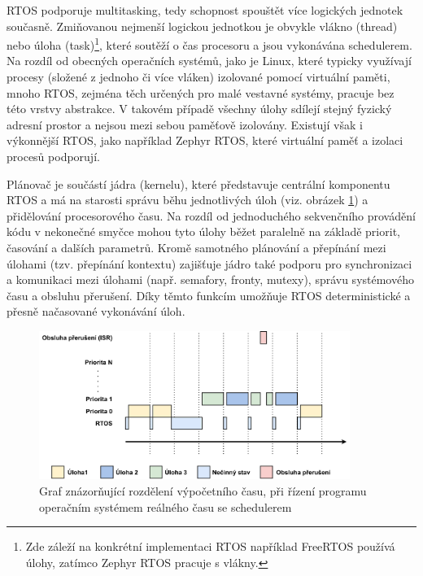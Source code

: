 RTOS podporuje multitasking, tedy schopnost spouštět více logických jednotek současně. Zmiňovanou nejmenší logickou jednotkou je obvykle vlákno (thread) nebo úloha (task)\footnote{Zde záleží na konkrétní implementaci RTOS například FreeRTOS používá úlohy, zatímco Zephyr RTOS pracuje s vlákny.}, které soutěží o čas procesoru a jsou vykonávána schedulerem. Na rozdíl od obecných operačních systémů, jako je Linux, které typicky využívají procesy (složené z jednoho či více vláken) izolované pomocí virtuální paměti, mnoho RTOS, zejména těch určených pro malé vestavné systémy, pracuje bez této vrstvy abstrakce. V takovém případě všechny úlohy sdílejí stejný fyzický adresní prostor a nejsou mezi sebou paměťově izolovány. Existují však i výkonnější RTOS, jako například Zephyr RTOS, které virtuální paměť a izolaci procesů podporují. \cite{freertos_what_is_rtos}

Plánovač je součástí jádra (kernelu), které představuje centrální komponentu RTOS a má na starosti správu běhu jednotlivých úloh (viz. obrázek \ref{fig:rtos-scheduling}) a přidělování procesorového času. Na rozdíl od jednoduchého sekvenčního provádění kódu v nekonečné smyčce mohou tyto úlohy běžet paralelně na základě priorit, časování a dalších parametrů. Kromě samotného plánování a přepínání mezi úlohami (tzv. přepínání kontextu) zajišťuje jádro také podporu pro synchronizaci a komunikaci mezi úlohami (např. semafory, fronty, mutexy), správu systémového času a obsluhu přerušení. Díky těmto funkcím umožňuje RTOS deterministické a přesně načasované vykonávání úloh.

\newpage

\begin{figure}[h]
    \centering
    \includegraphics[width=0.90\textwidth]{obrazky-figures/rtos_scheduling.pdf}
    
    \caption{Graf znázorňující rozdělení výpočetního času, při řízení programu operačním systémem reálného času se schedulerem}
    \label{fig:rtos-scheduling}
\end{figure}

